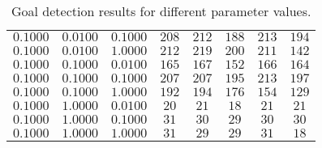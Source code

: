 \begin{table}[H]
\begin{tabular}{|c|c|c|c|c|c|c|c|}
        $0.1000$ & $0.0100$ & $0.1000$ & $208$ & $212$ & $188$ & $213$ & $194$ \\
        $0.1000$ & $0.0100$ & $1.0000$ & $212$ & $219$ & $200$ & $211$ & $142$ \\
        $0.1000$ & $0.1000$ & $0.0100$ & $165$ & $167$ & $152$ & $166$ & $164$ \\
        $0.1000$ & $0.1000$ & $0.1000$ & $207$ & $207$ & $195$ & $213$ & $197$ \\
        $0.1000$ & $0.1000$ & $1.0000$ & $192$ & $194$ & $176$ & $154$ & $129$ \\
        $0.1000$ & $1.0000$ & $0.0100$ & $20$ & $21$ & $18$ & $21$ & $21$ \\
        $0.1000$ & $1.0000$ & $0.1000$ & $31$ & $30$ & $29$ & $30$ & $30$ \\
        $0.1000$ & $1.0000$ & $1.0000$ & $31$ & $29$ & $29$ & $31$ & $18$ \\
        \hline
    \end{tabular}
    \caption{Goal detection results for different parameter values.}
    \label{tab:goal_results}
    \end{table}
    
